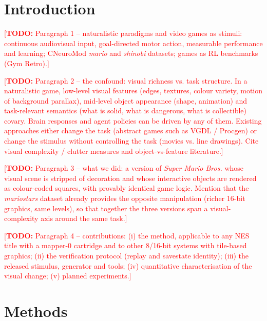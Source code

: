 \documentclass{article}
\newcommand{\TODO}[1]{\textcolor{red}{[\textbf{TODO:} #1]}}
\begin{document}


\section{Introduction}
\label{sec:intro}

\TODO{Paragraph 1 -- naturalistic paradigms and video games as stimuli: continuous audiovisual
input, goal-directed motor action, measurable performance and learning; CNeuroMod
\textit{mario}\cite{paugam2025mario} and \textit{shinobi}\cite{harel2025shinobi} datasets; games
as RL benchmarks (Gym Retro\cite{openai2018gymretro}).}

\TODO{Paragraph 2 -- the confound: visual richness vs. task structure. In a naturalistic game,
low-level visual features (edges, textures, colour variety, motion of background parallax),
mid-level object appearance (shape, animation) and task-relevant semantics (what is solid, what
is dangerous, what is collectible) covary. Brain responses and agent policies can be driven by any
of them. Existing approaches either change the task (abstract games such as VGDL / Procgen) or
change the stimulus without controlling the task (movies vs. line drawings). Cite visual
complexity / clutter measures and object-vs-feature literature.}

\TODO{Paragraph 3 -- what we did: a version of \textit{Super Mario Bros.} whose visual scene is
stripped of decoration and whose interactive objects are rendered as colour-coded squares, with
provably identical game logic. Mention that the \textit{mariostars} dataset already provides the
opposite manipulation (richer 16-bit graphics, same levels)\cite{paugam2025mario}, so that
together the three versions span a visual-complexity axis around the same task.}

\TODO{Paragraph 4 -- contributions: (i) the method, applicable to any NES title with a mapper-0
cartridge and to other 8/16-bit systems with tile-based graphics; (ii) the verification protocol
(replay and savestate identity); (iii) the released stimulus, generator and tools; (iv)
quantitative characterisation of the visual change; (v) planned experiments.}


\section{Methods}
\label{sec:methods}
\end{document}
